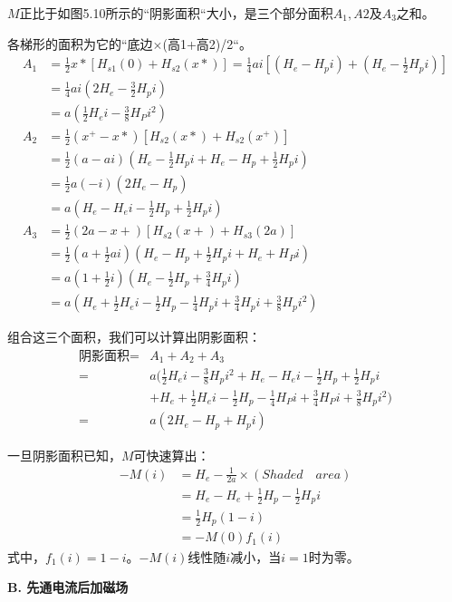$M$正比于如图5.10所示的``阴影面积``大小，是三个部分面积$A_1, A2$及$A_3$之和。

各梯形的面积为它的``底边$\times$(高1+高2)/2``。
\begin{align*}%
A_{1}&=\frac{1}{2}x*[H_{s1}(0)+H_{s2}(x*)]=\frac{1}{4}ai[(H_{e}-H_{p}i)+(H_{e}-\frac{1}{2}H_{p}i)]\\
&=\frac{1}{4}ai(2H_{e}-\frac{3}{2}H_{p}i)  \\
&=a(\frac{1}{2}H_{e}i-\frac{3}{8}H_{P}i^{2})\\
A_{2}&=\frac{1}{2}(x^{+}-x*)[H_{s2}(x*)+H_{s2}(x^{+})]\\
&=\frac{1}{2}(a-ai)(H_{e}-\frac{1}{2}H_{p}i+H_{e}-H_{p}+\frac{1}{2}H_{p}i)\\
&=\frac{1}{2}a(-i)(2H_{e}-H_{p})\\
&=a(H_{e}-H_{e}i-\frac{1}{2}H_{p}+\frac{1}{2}H_{p}i)\\
A_{3}&=\frac{1}{2}(2a-x+)[H_{s2}(x+)+H_{s3}(2a)]\\
&=\frac{1}{2}(a+\frac{1}{2}ai)(H_{e}-H_{p}+\frac{1}{2}H_{p}i+H_{e}+H_{P}i)\\
&=a(1+\frac{1}{2}i)(H_{e}-\frac{1}{2}H_{p}+\frac{3}{4}H_{p}i)\\
&=a(H_{e}+\frac{1}{2}H_{e}i-\frac{1}{2}H_{p}-\frac{1}{4}H_{p}i+\frac{3}{4}H_{p}i+\frac{3}{8}H_{p}i^{2})
\end{align*}

组合这三个面积，我们可以计算出阴影面积：
\begin{align*}%
\mbox{阴影面积}=&A_{1}+A_{2}+A_{3}\\
=&a(\frac{1}{2}H_{e}i-\frac{3}{8}H_{p}i^{2}+H_{e}-H_{e}i-\frac{1}{2}H_{p}+\frac{1}{2}H_{p}i\\
&+H_{e}+\frac{1}{2}H_{e}i-\frac{1}{2}H_{p}-\frac{1}{4}H_{P}i+\frac{3}{4}H_{P}i+\frac{3}{8}H_{p}i^{2})\\
=&a(2H_{e}-H_{p}+H_{p}i)
\end{align*}

一旦阴影面积已知，$M$可快速算出：
\begin{align*}%
-M(i)&=H_{e}-\frac{1}{2a}\times(Shaded\quad area)\\
&=H_{e}-H_{e}+\frac{1}{2}H_{p}-\frac{1}{2}H_{p}i\\
&=\frac{1}{2}H_{p}(1-i)\\
&=-M(0)f_{1}(i)
\end{align*}
式中，$f_1(i) = 1 − i$。$−M(i)$线性随$i$减小，当$i=1$时为零。 

\textbf{B. 先通电流后加磁场}

